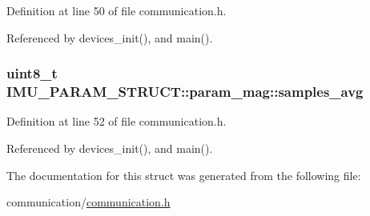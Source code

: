Definition at line 50 of file communication.\-h.



Referenced by devices\-\_\-init(), and main().

\hypertarget{structIMU__PARAM__STRUCT_1_1param__mag_a52c22cae6940eb39fb72aca66cfeba9a}{
\subsubsection[{samples\-\_\-avg}]{\setlength{\rightskip}{0pt plus 5cm}uint8\-\_\-t I\-M\-U\-\_\-\-P\-A\-R\-A\-M\-\_\-\-S\-T\-R\-U\-C\-T\-::param\-\_\-mag\-::samples\-\_\-avg}}\label{structIMU__PARAM__STRUCT_1_1param__mag_a52c22cae6940eb39fb72aca66cfeba9a}


Definition at line 52 of file communication.\-h.



Referenced by devices\-\_\-init(), and main().



The documentation for this struct was generated from the following file\-:\begin{DoxyCompactItemize}
\item 
communication/\hyperlink{communication_2communication_8h}{communication.\-h}\end{DoxyCompactItemize}
